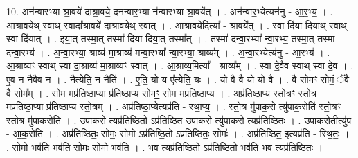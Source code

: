 \documentclass[17pt]{extarticle}
\begin{document}
10. अन॑न्वारभ्या श्रा॒वये॑ दाश्रा॒वये॒ दन॑न्वार॒भ्या न॑न्वारभ्या श्रा॒वये᳚त् । . अन॑न्वार॒भ्येत्यन॑नु - आ॒र॒भ्य॒ । . आ॒श्रा॒वये॒थ् स्वाथ् स्वादा᳚श्रा॒वये॑ दाश्रा॒वये॒थ् स्वात् । . आ॒श्रा॒वये॒दित्या᳚ - श्रा॒वये᳚त् । . स्वा दि॑या दिया॒थ् स्वाथ् स्वा दि॑यात् । . इ॒या॒त् तस्मा॒त् तस्मा॑ दिया दिया॒त् तस्मा᳚त् । . तस्मा॑ दन्वा॒रभ्या᳚ न्वा॒रभ्य॒ तस्मा॒त् तस्मा॑ दन्वा॒रभ्य॑ । . अ॒न्वा॒रभ्या॒ श्राव्य॑ मा॒श्राव्य॑ मन्वा॒रभ्या᳚ न्वा॒रभ्या॒ श्राव्य᳚म् । . अ॒न्वा॒रभ्येत्य॑नु - आ॒रभ्य॑ । . आ॒श्राव्यꣳ॒॒ स्वाथ् स्वा दा॒श्राव्य॑ मा॒श्राव्यꣳ॒॒ स्वात् । . आ॒श्राव्य॒मित्या᳚ - श्राव्य᳚म् । . स्वा दे॒वैव स्वाथ् स्वा दे॒व । . ए॒व न नैवैव न । . नैत्ये॑ति॒ न नैति॑ । . ए॒ति॒ यो य ए᳚त्येति॒ यः । . यो वै वै यो यो वै । . वै सोमꣳ॒॒ सोमं॒ ॅवै वै सोम᳚म् । . सोम॒ मप्र॑तिष्ठा॒प्या प्र॑तिष्ठाप्य॒ सोमꣳ॒॒ सोम॒ मप्र॑तिष्ठाप्य । . अप्र॑तिष्ठाप्य स्तो॒त्रꣳ स्तो॒त्र मप्र॑तिष्ठा॒प्या प्र॑तिष्ठाप्य स्तो॒त्रम् । . अप्र॑तिष्ठा॒प्येत्यप्र॑ति - स्था॒प्य॒ । . स्तो॒त्र मु॑पाक॒रो त्यु॑पाक॒रोति॑ स्तो॒त्रꣳ स्तो॒त्र मु॑पाक॒रोति॑ । . उ॒पा॒क॒रो त्यप्र॑तिष्ठि॒तो ऽप्र॑तिष्ठित उपाक॒रो त्यु॑पाक॒रो त्यप्र॑तिष्ठितः । . उ॒पा॒क॒रोतीत्यु॑प - आ॒क॒रोति॑ । . अप्र॑तिष्ठितः॒ सोमः॒ सोमो ऽप्र॑तिष्ठि॒तो ऽप्र॑तिष्ठितः॒ सोमः॑ । . अप्र॑तिष्ठित॒ इत्यप्र॑ति - स्थि॒तः॒ । . सोमो॒ भव॑ति॒ भव॑ति॒ सोमः॒ सोमो॒ भव॑ति । . भव॒ त्यप्र॑तिष्ठि॒तो ऽप्र॑तिष्ठितो॒ भव॑ति॒ भव॒ त्यप्र॑तिष्ठितः । \newline
\end{document}
